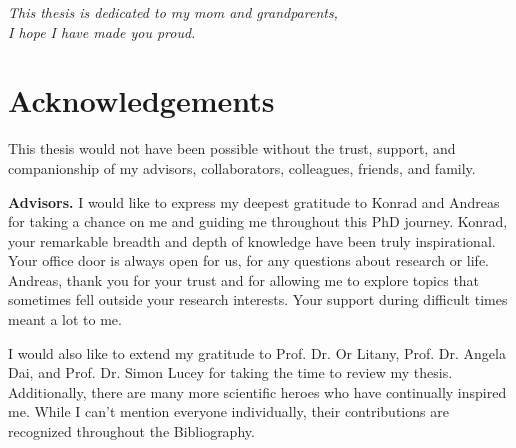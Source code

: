 \newpage
\thispagestyle{empty}
\mbox{}

\newpage
\thispagestyle{empty}
\vspace*{\fill}
\begin{center}
    \textit{
    This thesis is dedicated to my mom and grandparents, \\
    I hope I have made you proud.
    }
\end{center}
\vspace*{\fill}

\newpage
\thispagestyle{empty}
\mbox{}



\chapter*{Acknowledgements}
\label{chap:acknowledgements}

This thesis would not have been possible without the trust, support, and companionship of my advisors, collaborators, colleagues, friends, and family.

\noindent
\textbf{Advisors.}
I would like to express my deepest gratitude to Konrad and Andreas for taking a chance on me and guiding me throughout this PhD journey. Konrad, your remarkable breadth and depth of knowledge have been truly inspirational. Your office door is always open for us, for any questions about research or life. Andreas, thank you for your trust and for allowing me to explore topics that sometimes fell outside your research interests. Your support during difficult times meant a lot to me.

I would also like to extend my gratitude to Prof. Dr. Or Litany, Prof. Dr. Angela Dai, and Prof. Dr. Simon Lucey for taking the time to review my thesis. Additionally, there are many more scientific heroes who have continually inspired me. While I can't mention everyone individually, their contributions are recognized throughout the Bibliography.

